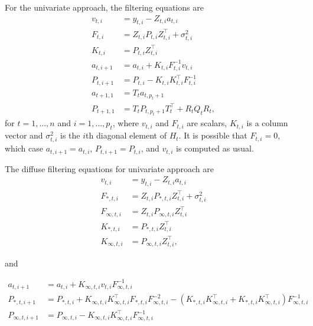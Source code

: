\documentclass[nojss,article]{jss}\usepackage[]{graphicx}\usepackage[]{color}
\begin{document}
For the univariate approach, the filtering equations are
\begin{equation*}
\begin{aligned}
v_{t,i} &= y_{t,i} - Z_{t,i} a_{t,i} \\
F_{t,i} &= Z_{t,i} P_{t,i} Z_{t,i}^\top + \sigma^2_{t,i} \\
K_{t,i} &= P_{t,i} Z_{t,i}^\top \\
a_{t,i+1} &= a_{t,i} + K_{t,i}F_{t,i}^{-1} v_{t,i} \\
P_{t,i+1} &= P_{t,i} -K_{t,i}K^\top_{t,i}F_{t,i}^{-1}\\
a_{t+1,1} &= T_t a_{t,p_t+1}\\
P_{t+1,1} &= T_t P_{t,p_t+1} T_t^\top + R_t Q_t R_t, 
\end{aligned}
\end{equation*}
for $t=1,\ldots,n$ and  $i=1,\ldots,p_t$, where $v_{t,i}$ and $F_{t,i}$ are
scalars, $K_{t,i}$ is a column vector and $\sigma^2_{t,i}$ is the $i$th diagonal
element of $H_t$. It is possible that $F_{t,i}=0$, which case $a_{t,i+1} =
a_{t,i}$, $P_{t,i+1} = P_{t,i}$, and $v_{t,i}$ is computed as usual.  

The diffuse filtering equations for univariate approach are
\begin{equation*}
\begin{aligned}
v_{t,i} &= y_{t,i} - Z_{t,i} a_{t,i} \\
F_{\ast,t,i} &= Z_{t,i} P_{\ast,t,i} Z_{t,i}^\top + \sigma^2_{t,i} \\
F_{\infty,t,i} &= Z_{t,i} P_{\infty,t,i} Z_{t,i}^\top \\
K_{\ast,t,i} &= P_{\ast,t,i} Z_{t,i}^\top \\
K_{\infty,t,i} &= P_{\infty,t,i} Z_{t,i}^\top,
\end{aligned}
\end{equation*}

and

\begin{equation*}
\begin{aligned}
a_{t,i+1} &= a_{t,i} + K_{\infty,t,i} v_{t,i}F_{\infty,t,i}^{-1} \\
P_{\ast,t,i+1} &= P_{\ast,t,i}
+K_{\infty,t,i}K^\top_{\infty,t,i}F_{\ast,t,i}F_{\infty,t,i}^{-2}
-(K_{\ast,t,i}K^\top_{\infty,t,i}+K_{\ast,t,i}K^\top_{\infty,t,i})F_{\infty,t,i}^{-1}\\
P_{\infty,t,i+1} &= P_{\infty,t,i}
-K_{\infty,t,i}K^\top_{\infty,t,i}F_{\infty,t,i}^{-1}\\
\end{aligned} 
\end{equation*}
\end{document}
